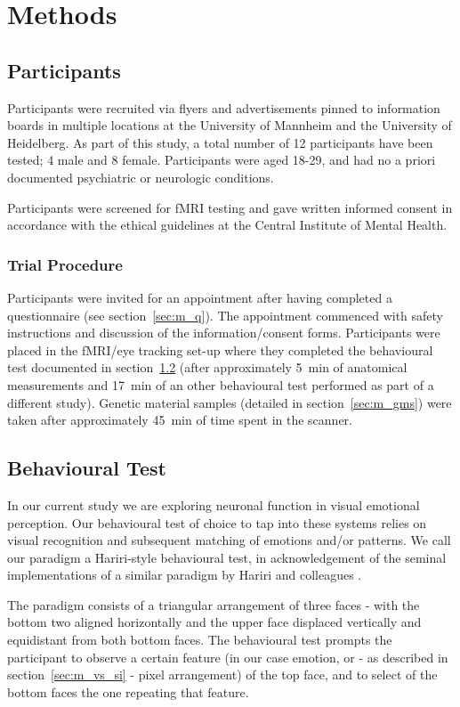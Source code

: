 \chapter{Methods}\label{sec:m}
    \section{Participants}\label{sec:m_p}
	Participants were recruited via flyers and advertisements pinned to information boards in multiple locations at the University of Mannheim and the University of Heidelberg.
	As part of this study, a total number of 12 participants have been tested; 4 male and 8 female.
	Participants were aged 18-29, and had no a priori documented psychiatric or neurologic conditions.
	
	Participants were screened for fMRI testing and gave written informed consent in accordance with the ethical guidelines at the Central Institute of Mental Health.
	\subsection{Trial Procedure}
	    Participants were invited for an appointment after having completed a questionnaire (see section~\ref{sec:m_q}).
	    The appointment commenced with safety instructions and discussion of the information/consent forms.
	    Participants were placed in the fMRI/eye tracking set-up where they completed the behavioural test documented in section~\ref{sec:m_bt} (after approximately \SI{5}{\minute} of anatomical measurements and \SI{17}{\minute} of an other behavioural test performed as part of a different study).
	    Genetic material samples (detailed in section~\ref{sec:m_gms}) were taken after approximately \SI{45}{\minute} of time spent in the scanner.
    \section{Behavioural Test}\label{sec:m_bt}
	In our current study we are exploring neuronal function in visual emotional perception.
	Our behavioural test of choice to tap into these systems relies on visual recognition and subsequent matching of emotions and/or patterns.
	We call our paradigm a Hariri-style behavioural test, in acknowledgement of the seminal implementations of a similar paradigm by Hariri and colleagues \citep{Hariri2000,Hariri2003}.
	    
	The paradigm consists of a triangular arrangement of three faces - with the bottom two aligned horizontally and the upper face displaced vertically and equidistant from both bottom faces.
	The behavioural test prompts the participant to observe a certain feature (in our case emotion, or - as described in section~\ref{sec:m_vs_si} - pixel arrangement) of the top face, and to select of the bottom faces the one repeating that feature.
	
